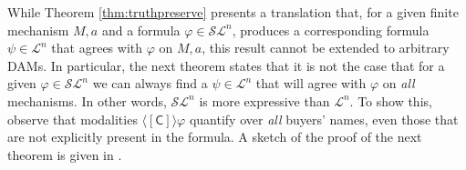 \documentclass[letterpaper]{article} %
\theoremstyle{definition}
\newtheorem{theorem}{Theorem}
\begin{document}
While Theorem \ref{thm:truthpreserve} presents a translation that, for a given finite mechanism $M,a$ and a formula $\varphi \in \mathcal{SL}^n$, produces a corresponding formula $\psi \in \mathcal{L}^n$ that agrees with $\varphi$ on $M,a$, this result cannot be extended to arbitrary DAMs. In particular, the next theorem states that it is not the case that for a given $\varphi \in \mathcal{SL}^n$ we can always find a $\psi \in \mathcal{L}^n$ that will agree with $\varphi$ on \textit{all} mechanisms. In other words, $\mathcal{SL}^n$ is more expressive than $\mathcal{L}^n$. To show this, observe that modalities $\langle \! [ \mathsf{C} ] \! \rangle \varphi$ quantify over \textit{all} buyers' names, even those that are not explicitly present in the formula. A sketch of the proof of the next theorem is given in \cite{diffusionlogic}. 

 
 
\end{document}
